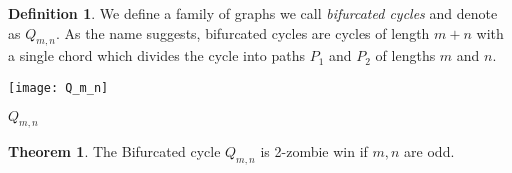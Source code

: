 \documentclass[letterpaper, 10pt]{article}
\begin{document}
\theoremstyle{definition}
\newtheorem{definition}{Definition}
\newtheorem{theorem}{Theorem}
\newtheorem{proposition}{Proposition}
\newtheorem{corollary}{Corollary}
\newtheorem{lemma}{Lemma}
\newtheorem{proofpart}{Part}
\makeatletter
{}
\makeatother

\begin{definition}
 We define a family of graphs we call \emph{bifurcated cycles} and denote as $Q_{m,n}$.
 As the name suggests, bifurcated cycles are cycles of length $m+n$ with a single chord
 which divides the cycle into paths $P_1$ and $P_2$ of lengths $m$ and $n$.
\end{definition}

\begin{center}
 \texttt{[image: Q\_m\_n]}

 $Q_{m,n}$
\end{center}

\begin{theorem}
The Bifurcated cycle $Q_{m,n}$ is 2-zombie win if $m, n$ are odd.
\end{theorem}
\end{document}
